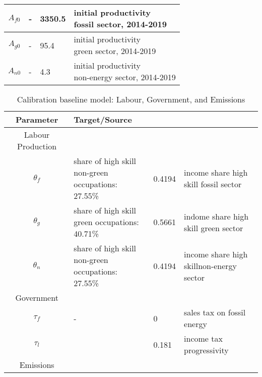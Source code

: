 \begin{table}[h!]
\begin{center}
\begin{tabular}{c|lll}
				\hline
				$A_{f0}$&- &3350.5& \makecell[l]{initial productivity \\ fossil sector, 2014-2019}  \\
				\hline
				$A_{g0}$&- &95.4& \makecell[l]{initial productivity \\ green sector, 2014-2019}  \\
				\hline
				$A_{n0}$&- &4.3& \makecell[l]{initial productivity \\ non-energy sector, 2014-2019}  \\
				\hline \hline
			\end{tabular}
		\end{center}
	\end{table}
\begin{table}[hh!!!!!]
	\begin{center}
		\captionsetup{width=0.9\textwidth}
		\caption{ Calibration baseline model: Labour, Government, and Emissions}
		\label{tab:calib2}
		\begin{tabular}{c|lll}
			\hline \hline
			Parameter& Target/Source& \makecell[l]{Calibration}& \makecell[l]{Meaning}\\ 
			\hline
			\hline
			Labour Production&\multicolumn{3}{c}{}\\
			\hline 
			
			\hline
			$\theta_f$&\makecell[l]{share of high skill\\ non-green occupations: \\27.55\% }&0.4194&\makecell[l]{income share high \\ skill fossil sector}\\
			\hline
			$\theta_g$&\makecell[l]{share of high skill\\ green occupations: \\40.71\% }&0.5661&\makecell[l]{indome share high \\skill green sector}\\
			\hline
			$\theta_n$&\makecell[l]{share of high skill\\ non-green occupations: \\27.55\% }&0.4194&\makecell[l]{income share high \\ skillnon-energy sector}\\
			\hline
			\hline
			Government&\multicolumn{3}{c}{}\\
			\hline
			
			\hline
			$\tau_f$&- &0& sales tax on fossil energy\\
			\hline
			$\tau_l$&\cite{Heathcote2017OptimalFramework} &0.181& income tax progressivity\\
			\hline	
			\hline
			Emissions&\multicolumn{3}{c}{}\\
			\hline
			

\end{tabular}
\end{center}
\end{table}
